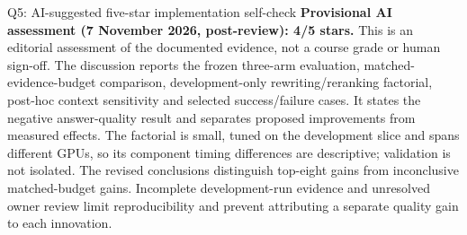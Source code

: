 \begin{review}{Q5: AI-suggested five-star implementation self-check}
\quad\textbf{Provisional AI assessment (7 November 2026, post-review): 4/5 stars.} This is an editorial assessment of the documented evidence, not a course grade or human sign-off. The discussion reports the frozen three-arm evaluation, matched-evidence-budget comparison, development-only rewriting/reranking factorial, post-hoc context sensitivity and selected success/failure cases. It states the negative answer-quality result and separates proposed improvements from measured effects. The factorial is small, tuned on the development slice and spans different GPUs, so its component timing differences are descriptive; validation is not isolated. The revised conclusions distinguish top-eight gains from inconclusive matched-budget gains. Incomplete development-run evidence and unresolved owner review limit reproducibility and prevent attributing a separate quality gain to each innovation.
\end{review}

